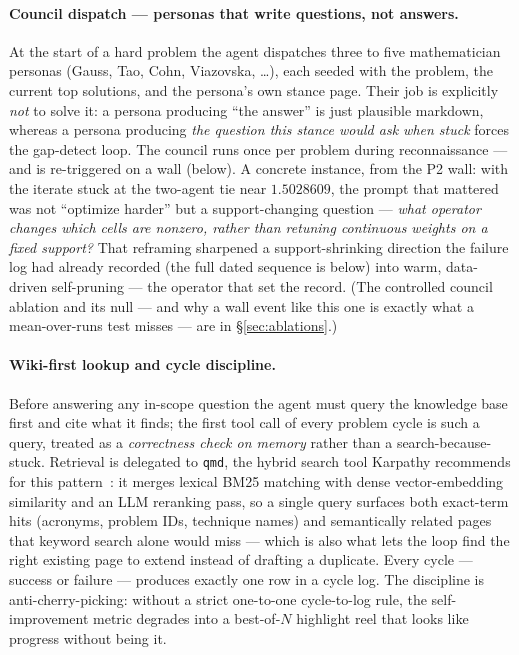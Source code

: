 \documentclass[11pt]{article}
\newcommand{\src}[1]{}
\begin{document}
\paragraph{Council dispatch --- personas that write questions, not answers.}
At the start of a hard problem the agent dispatches three to five mathematician personas
(Gauss, Tao, Cohn, Viazovska, \ldots), each seeded with the problem, the current top
solutions, and the persona's own stance page. Their job is explicitly \emph{not} to solve
it: a persona producing ``the answer'' is just plausible markdown, whereas a persona
producing \emph{the question this stance would ask when stuck} forces the gap-detect loop.
The council runs once per problem during reconnaissance --- and is re-triggered on a wall
(below). A concrete instance, from the P2 wall: with the iterate stuck at the two-agent tie
near $1.5028609$, the prompt that mattered was not ``optimize harder'' but a support-changing
question --- \emph{what operator changes which cells are nonzero, rather than retuning
continuous weights on a fixed support?} That reframing sharpened a support-shrinking direction
the failure log had already recorded (the full dated sequence is below) into warm, data-driven
self-pruning --- the operator that set the record. (The controlled council ablation and its
null --- and why a wall event like this one is exactly what a mean-over-runs test misses ---
are in \S\ref{sec:ablations}.)
\src{.claude/rules/council-dispatch.md}

\paragraph{Wiki-first lookup and cycle discipline.}
Before answering any in-scope question the agent must query the knowledge base first and cite
what it finds; the first tool call of every problem cycle is such a query, treated as a
\emph{correctness check on memory} rather than a search-because-stuck. Retrieval is delegated
to \texttt{qmd}, the hybrid search tool Karpathy recommends for this pattern~\cite{karpathy2026llmwiki}:
it merges lexical BM25 matching with dense vector-embedding similarity and an LLM reranking pass,
so a single query surfaces both exact-term hits (acronyms, problem IDs, technique names) and
semantically related pages that keyword search alone would miss --- which is also what lets the
loop find the right existing page to extend instead of drafting a duplicate. Every cycle ---
success or failure --- produces exactly one row in a cycle log. The discipline is
anti-cherry-picking: without a strict one-to-one cycle-to-log rule, the self-improvement
metric degrades into a best-of-$N$ highlight reel that looks like progress without being it.
\src{.claude/rules/wiki-first-lookup.md, .claude/rules/cycle-discipline.md}
\end{document}
